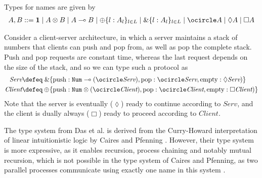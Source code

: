 \begin{defi}
Types for names are given by
\begin{align*}
    A,B ::= \mathbf{1} \mid A \otimes B \mid A \multimap B \mid \oplus\{l : A_l\}_{l\in L} \mid \&\{l : A_l\}_{l\in L} \mid \ocircle A \mid \lozenge A \mid \Box A
\end{align*}
\label{def:temporalsessiontypestypes}
\end{defi}

\begin{examp}
Consider a client-server architecture, in which a server maintains a stack of numbers that clients can push and pop from, as well as pop the complete stack. Push and pop requests are constant time, whereas the last request depends on the size of the stack, and so we can type such a protocol as
\begin{align*}
    \textit{Serv} \defeq&\; \&\{\text{push} : \texttt{Num} \multimap (\ocircle\textit{Serv}), \text{pop} : \ocircle\textit{Serv}, \text{empty} : \lozenge\textit{Serv})\}\\
    \textit{Client} \defeq& \oplus\!\{\text{push} : \texttt{Num} \otimes (\ocircle\textit{Client}), \text{pop} : \ocircle\textit{Client}, \text{empty} : \Box\textit{Client})\}
\end{align*}
Note that the server is eventually ($\lozenge$) ready to continue according to $\textit{Serv}$, and the client is dually always ($\Box$) ready to proceed according to $\textit{Client}$. %
\end{examp}
The type system from Das et al. \cite{DasEtAl2018} is derived from the Curry-Howard interpretation of linear intuitionistic logic by Caires and Pfenning \cite{CairesPfenning2010}. However, their type system is more expressive, as it enables recursion, process chaining and notably mutual recursion, which is not possible in the type system of Caires and Pfenning, as two parallel processes communicate using exactly one name in this system \cite{DardhaGay2018}.\\


